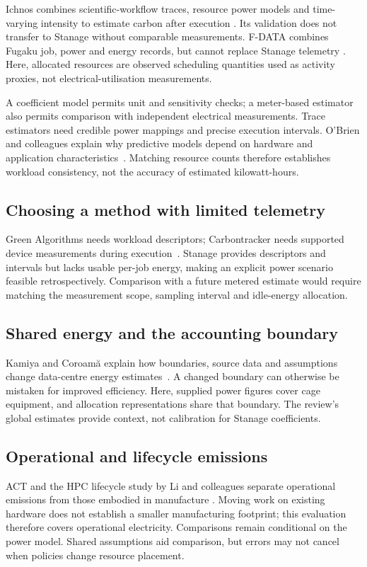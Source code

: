 Ichnos combines scientific-workflow traces, resource power models and time-varying intensity to estimate carbon after execution \citep{west2024ichnos}. Its validation does not transfer to Stanage without comparable measurements. F-DATA combines Fugaku job, power and energy records, but cannot replace Stanage telemetry \citep{antici2025fdata}. Here, allocated resources are observed scheduling quantities used as activity proxies, not electrical-utilisation measurements.

A coefficient model permits unit and sensitivity checks; a meter-based estimator also permits comparison with independent electrical measurements. Trace estimators need credible power mappings and precise execution intervals. O'Brien and colleagues explain why predictive models depend on hardware and application characteristics~\citep{obrien2017survey}. Matching resource counts therefore establishes workload consistency, not the accuracy of estimated kilowatt-hours.

\subsection{Choosing a method with limited telemetry}
Green Algorithms needs workload descriptors; Carbontracker needs supported device measurements during execution~\citep{lannelongue2021green,anthony2020carbontracker}. Stanage provides descriptors and intervals but lacks usable per-job energy, making an explicit power scenario feasible retrospectively. Comparison with a future metered estimate would require matching the measurement scope, sampling interval and idle-energy allocation.

\subsection{Shared energy and the accounting boundary}
Kamiya and Coroam{\u a} explain how boundaries, source data and assumptions change data-centre energy estimates~\citep{kamiya2025datacentre}. A changed boundary can otherwise be mistaken for improved efficiency. Here, supplied power figures cover cage equipment, and allocation representations share that boundary. The review's global estimates provide context, not calibration for Stanage coefficients.

\subsection{Operational and lifecycle emissions}
ACT and the HPC lifecycle study by Li and colleagues separate operational emissions from those embodied in manufacture \citep{gupta2022act,li2023sustainable}. Moving work on existing hardware does not establish a smaller manufacturing footprint; this evaluation therefore covers operational electricity. Comparisons remain conditional on the power model. Shared assumptions aid comparison, but errors may not cancel when policies change resource placement.

